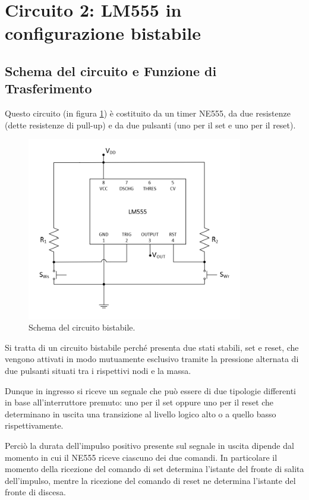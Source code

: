 \documentclass{report}
\begin{document}
\newpage
\section{Circuito 2: LM555 in configurazione bistabile}\label{sez2}
\subsection{Schema del circuito e Funzione di Trasferimento}
Questo circuito (in figura \ref{figura:schema2}) è costituito da un timer NE555, da due resistenze (dette resistenze di pull-up) e da due pulsanti (uno per il set e uno per il reset).

\begin{figure}[h!]
	\centering
	\includegraphics[height=8cm]{immagini/schema2}
	\caption{Schema del circuito bistabile.}
	\label{figura:schema2}
\end{figure}

\noindent Si tratta di un circuito bistabile perché presenta due stati stabili, set e reset, che vengono attivati in modo mutuamente esclusivo tramite la pressione alternata di due pulsanti situati tra i rispettivi nodi e la massa.

Dunque in ingresso si riceve un segnale che può essere di due tipologie differenti in base all'interruttore premuto: uno per il set oppure uno per il reset che determinano in uscita una transizione al livello logico alto o a quello basso rispettivamente.

Perciò la durata dell'impulso positivo presente sul segnale in uscita dipende dal momento in cui il NE555 riceve ciascuno dei due comandi. In particolare il momento della ricezione del comando di set determina l'istante del fronte di salita dell'impulso, mentre la ricezione del comando di reset ne determina l'istante del fronte di discesa.
\end{document}
